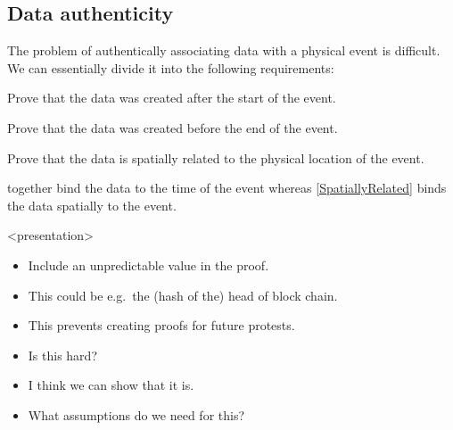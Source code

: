 \subsection{Data authenticity}
\label{DataAuthenticity}

The problem of authentically associating data with a physical event is 
difficult.
We can essentially divide it into the following requirements:
\begin{frame}
\begin{requirements}[A]
  \item\label{CreatedAfterStart} Prove that the data was created after the 
    start of the event.
  \item\label{CreatedBeforeEnd} Prove that the data was created before the end 
    of the event.
  \item\label{SpatiallyRelated} Prove that the data is spatially related to the 
    physical location of the event.
\end{requirements} %
\end{frame}
 together bind the data to the time of 
the event whereas \cref{SpatiallyRelated} binds the data spatially to the 
event.

\begin{frame}<presentation>
  \begin{solution}
    \begin{itemize}
      \item Include an unpredictable value in the proof.
      \item This could be e.g.\ the (hash of the) head of block chain.
      \item This prevents creating proofs for future protests.
    \end{itemize}
  \end{solution}

  \pause

  \begin{question}
    \begin{itemize}
      \item Is this hard?
      \item I think we can show that it is.
      \item What assumptions do we need for this?
    \end{itemize}
  \end{question}
\end{frame}

